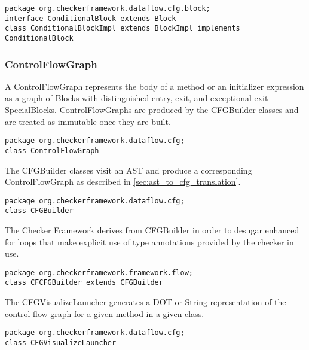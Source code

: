\begin{verbatim}
package org.checkerframework.dataflow.cfg.block;
interface ConditionalBlock extends Block
class ConditionalBlockImpl extends BlockImpl implements ConditionalBlock
\end{verbatim}



\subsubsection{ControlFlowGraph}
\label{sec:control_flow_graph_class}

A ControlFlowGraph represents the body of a method or an initializer
expression as a graph of Blocks with distinguished entry, exit, and
exceptional exit SpecialBlocks.  ControlFlowGraphs are produced by the
CFGBuilder classes and are treated as immutable once they are built.

\begin{verbatim}
package org.checkerframework.dataflow.cfg;
class ControlFlowGraph
\end{verbatim}

\label{sec:cfg_builder_classes}

The CFGBuilder classes visit an AST and produce a corresponding
ControlFlowGraph as described in \autoref{sec:ast_to_cfg_translation}.

\begin{verbatim}
package org.checkerframework.dataflow.cfg;
class CFGBuilder
\end{verbatim}

The Checker Framework derives from CFGBuilder in order to desugar
enhanced for loops that make explicit use of type annotations provided
by the checker in use.

\begin{verbatim}
package org.checkerframework.framework.flow;
class CFCFGBuilder extends CFGBuilder
\end{verbatim}

\label{sec:cfg_visualize_launcher_class}

The CFGVisualizeLauncher generates a DOT or String representation of
the control flow graph for a given method in a given class.

\begin{verbatim}
package org.checkerframework.dataflow.cfg;
class CFGVisualizeLauncher
\end{verbatim}

